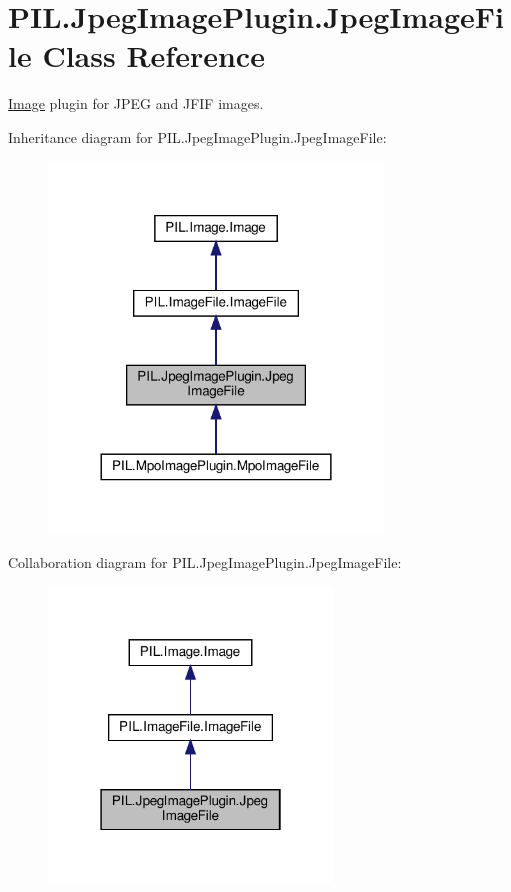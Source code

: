 \hypertarget{classPIL_1_1JpegImagePlugin_1_1JpegImageFile}{}\section{P\+I\+L.\+Jpeg\+Image\+Plugin.\+Jpeg\+Image\+File Class Reference}
\label{classPIL_1_1JpegImagePlugin_1_1JpegImageFile}


\hyperlink{namespacePIL_1_1Image}{Image} plugin for J\+P\+EG and J\+F\+IF images.  




Inheritance diagram for P\+I\+L.\+Jpeg\+Image\+Plugin.\+Jpeg\+Image\+File\+:
\nopagebreak
\begin{figure}[H]
\begin{center}
\leavevmode
\includegraphics[width=252pt]{classPIL_1_1JpegImagePlugin_1_1JpegImageFile__inherit__graph}
\end{center}
\end{figure}


Collaboration diagram for P\+I\+L.\+Jpeg\+Image\+Plugin.\+Jpeg\+Image\+File\+:
\nopagebreak
\begin{figure}[H]
\begin{center}
\leavevmode
\includegraphics[width=214pt]{classPIL_1_1JpegImagePlugin_1_1JpegImageFile__coll__graph}
\end{center}
\end{figure}
